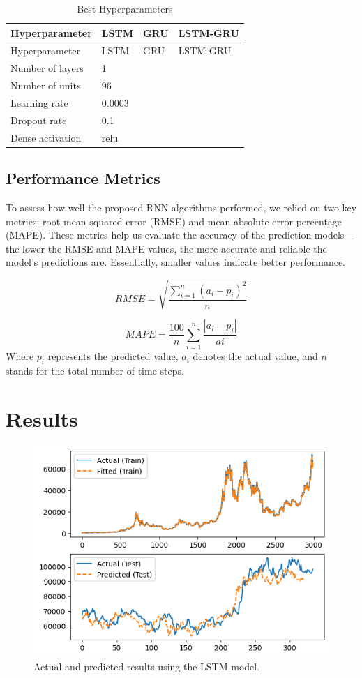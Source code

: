 \documentclass[]{interact}
\theoremstyle{plain}%
\theoremstyle{definition}
\theoremstyle{remark}
\begin{document}
\begin{longtable}[]{@{}llll@{}}
\caption{Best Hyperparameters}\tabularnewline
\toprule\noalign{}
Hyperparameter & LSTM & GRU & LSTM-GRU \\
\midrule\noalign{}
\endfirsthead
\toprule\noalign{}
Hyperparameter & LSTM & GRU & LSTM-GRU \\
\midrule\noalign{}
\endhead
\bottomrule\noalign{}
\endlastfoot
Number of layers & 1 & & \\
Number of units & 96 & & \\
Learning rate & 0.0003 & & \\
Dropout rate & 0.1 & & \\
Dense activation & relu & & \\
\end{longtable}

\subsection{Performance Metrics}\label{performance-metrics}

To assess how well the proposed RNN algorithms performed, we relied on
two key metrics: root mean squared error (RMSE) and mean absolute error
percentage (MAPE). These metrics help us evaluate the accuracy of the
prediction models---the lower the RMSE and MAPE values, the more
accurate and reliable the model's predictions are. Essentially, smaller
values indicate better performance.

\begin{equation}
RMSE = \sqrt{\dfrac{\sum_{i=1}^n (a_i-p_i)^2}{n} }
\end{equation}

\begin{equation}
MAPE = \dfrac{100}{n}\sum_{i=1}^n \dfrac{|a_i-p_i|}{ai}
\end{equation} Where \(p_i\) represents the predicted value, \(a_i\)
denotes the actual value, and \(n\) stands for the total number of time
steps.

\section{Results}\label{results}

\begin{figure}
\includegraphics[width=0.6\linewidth]{LSTM_pred} \caption{Actual and predicted results using the LSTM model.}\label{fig:unnamed-chunk-3}
\end{figure}
\end{document}
